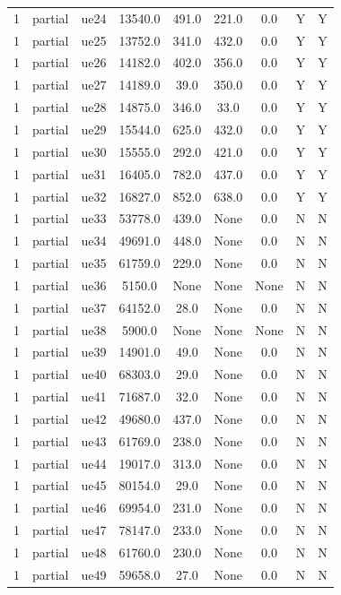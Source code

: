 \begin{table}[ht]
\begin{tabular}{|c|c|c|c|c|c|c|c|c|}
1 & partial & ue24 & 13540.0 & 491.0 & 221.0 & 0.0 & Y & Y \\
1 & partial & ue25 & 13752.0 & 341.0 & 432.0 & 0.0 & Y & Y \\
1 & partial & ue26 & 14182.0 & 402.0 & 356.0 & 0.0 & Y & Y \\
1 & partial & ue27 & 14189.0 & 39.0 & 350.0 & 0.0 & Y & Y \\
1 & partial & ue28 & 14875.0 & 346.0 & 33.0 & 0.0 & Y & Y \\
1 & partial & ue29 & 15544.0 & 625.0 & 432.0 & 0.0 & Y & Y \\
1 & partial & ue30 & 15555.0 & 292.0 & 421.0 & 0.0 & Y & Y \\
1 & partial & ue31 & 16405.0 & 782.0 & 437.0 & 0.0 & Y & Y \\
1 & partial & ue32 & 16827.0 & 852.0 & 638.0 & 0.0 & Y & Y \\
1 & partial & ue33 & 53778.0 & 439.0 & None & 0.0 & N & N \\
1 & partial & ue34 & 49691.0 & 448.0 & None & 0.0 & N & N \\
1 & partial & ue35 & 61759.0 & 229.0 & None & 0.0 & N & N \\
1 & partial & ue36 & 5150.0 & None & None & None & N & N \\
1 & partial & ue37 & 64152.0 & 28.0 & None & 0.0 & N & N \\
1 & partial & ue38 & 5900.0 & None & None & None & N & N \\
1 & partial & ue39 & 14901.0 & 49.0 & None & 0.0 & N & N \\
1 & partial & ue40 & 68303.0 & 29.0 & None & 0.0 & N & N \\
1 & partial & ue41 & 71687.0 & 32.0 & None & 0.0 & N & N \\
1 & partial & ue42 & 49680.0 & 437.0 & None & 0.0 & N & N \\
1 & partial & ue43 & 61769.0 & 238.0 & None & 0.0 & N & N \\
1 & partial & ue44 & 19017.0 & 313.0 & None & 0.0 & N & N \\
1 & partial & ue45 & 80154.0 & 29.0 & None & 0.0 & N & N \\
1 & partial & ue46 & 69954.0 & 231.0 & None & 0.0 & N & N \\
1 & partial & ue47 & 78147.0 & 233.0 & None & 0.0 & N & N \\
1 & partial & ue48 & 61760.0 & 230.0 & None & 0.0 & N & N \\
1 & partial & ue49 & 59658.0 & 27.0 & None & 0.0 & N & N \\

\end{tabular}
\end{table}
